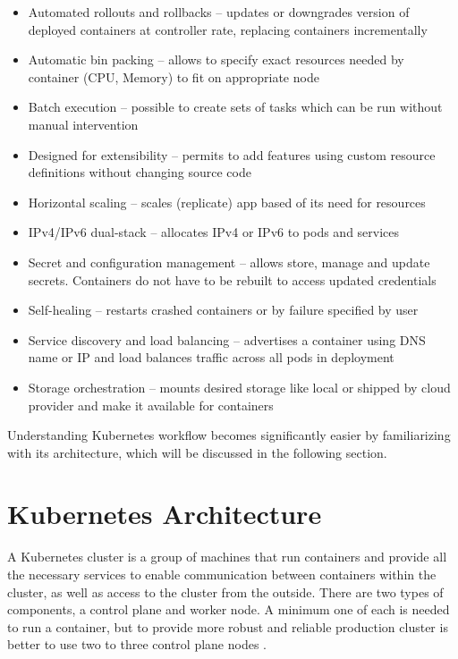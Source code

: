 \begin{itemize}
    \item Automated rollouts and rollbacks -- updates or downgrades version of deployed containers at controller rate, replacing containers incrementally
    \item Automatic bin packing --  allows to specify exact resources needed by container (CPU, Memory) to fit on appropriate node
    \item Batch execution -- possible to create sets of tasks which can be run without manual intervention
    \item Designed for extensibility -- permits to add features using custom resource definitions without changing source code
    \item Horizontal scaling -- scales (replicate) app based of its need for resources
    \item IPv4/IPv6 dual-stack -- allocates IPv4 or IPv6 to pods and services
    \item Secret and configuration management -- allows store, manage and update secrets. Containers do not have to be rebuilt to access updated  credentials
    \item Self-healing -- restarts crashed containers or by failure specified by user
    \item Service discovery and load balancing -- advertises a container using DNS name or IP and load balances traffic across all pods in deployment
    \item Storage orchestration -- mounts desired storage like local or shipped by cloud provider and make it available for containers
\end{itemize}
Understanding Kubernetes workflow becomes significantly easier by familiarizing with its architecture, which will be discussed in the following section.



\section{Kubernetes Architecture}
\label{sec:k8s_arch}
A Kubernetes cluster is a group of machines that run containers and provide all the necessary services to enable communication between containers within the cluster, as well as access to the cluster from the outside. There are two types of components, a control plane and worker node. A minimum one of each is needed to run a container, but to provide more robust and reliable production cluster is better to use two to three control plane nodes  \cite{KubernetesArch}. 

